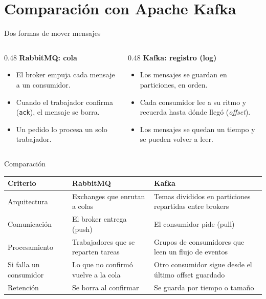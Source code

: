 \section{Comparación con Apache Kafka}

\begin{frame}{Dos formas de mover mensajes}
  \begin{columns}[T]
    \begin{column}{0.48\textwidth}
      \textbf{RabbitMQ: cola}
      \begin{itemize}
        \item El broker empuja cada mensaje a un consumidor.
        \item Cuando el trabajador confirma (\texttt{ack}), el mensaje se borra.
        \item Un pedido lo procesa un solo trabajador.
      \end{itemize}
    \end{column}
    \begin{column}{0.48\textwidth}
      \textbf{Kafka: registro (log)}
      \begin{itemize}
        \item Los mensajes se guardan en particiones, en orden.
        \item Cada consumidor lee a su ritmo y recuerda hasta dónde llegó (\textit{offset}).
        \item Los mensajes se quedan un tiempo y se pueden volver a leer.
      \end{itemize}
    \end{column}
  \end{columns}
\end{frame}

\begin{frame}{Comparación}
  \small
  \begin{tabularx}{\textwidth}{lXX}
    \toprule
    Criterio & RabbitMQ & Kafka \\
    \midrule
    Arquitectura & Exchanges que enrutan a colas & Temas divididos en particiones repartidas entre brokers \\
    Comunicación & El broker entrega (push) & El consumidor pide (pull) \\
    Procesamiento & Trabajadores que se reparten tareas & Grupos de consumidores que leen un flujo de eventos \\
    Si falla un consumidor & Lo que no confirmó vuelve a la cola & Otro consumidor sigue desde el último offset guardado \\
    Retención & Se borra al confirmar & Se guarda por tiempo o tamaño \\
    \bottomrule
  \end{tabularx}
\end{frame}

